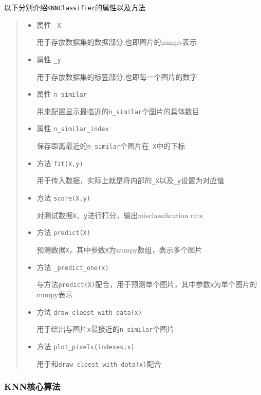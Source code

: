 \documentclass[UTF8]{ctexart}
\begin{document}
以下分别介绍\lstinline{KNNClassifier}的属性以及方法

\begin{quote}
    \begin{itemize}
        \item 属性 \lstinline{_X}
        
        用于存放数据集的数据部分,也即图片的numpy表示
        \item 属性 \lstinline{_y}
        
        用于存放数据集的标签部分,也即每一个图片的数字
        \item 属性 \lstinline{n_similar}
        
        用来配置显示最临近的\lstinline{n_similar}个图片的具体数目
        \item 属性 \lstinline{n_similar_index}
        
        保存距离最近的\lstinline{n_similar}个图片在\lstinline{_X}中的下标
    
        \item 方法 \lstinline{fit(X,y)}
    
        用于传入数据，实际上就是将内部的\lstinline{_X}以及\lstinline{_y}设置为对应值
        \item 方法 \lstinline{score(X,y)}
    
        对测试数据\lstinline{X, y}进行打分，输出misclassification rate
        \item 方法 \lstinline{predict(X)}
    
        预测数据\lstinline{X}，其中参数\lstinline{X}为numpy数组，表示多个图片
        \item 方法 \lstinline{_predict_one(x)}
    
        与方法\lstinline{predict(X)}配合，用于预测单个图片，其中参数\lstinline{x}为单个图片的numpy表示
        \item 方法 \lstinline{draw_cloest_with_data(x)}
    
        用于绘出与图片\lstinline{x}最接近的\lstinline{n_similar}个图片
        \item 方法 \lstinline{plot_pixels(indexes,x)}
    
        用于和\lstinline{draw_cloest_with_data(x)}配合
    \end{itemize}
\end{quote}

\newpage
\subsubsection{KNN核心算法}
\end{document}

